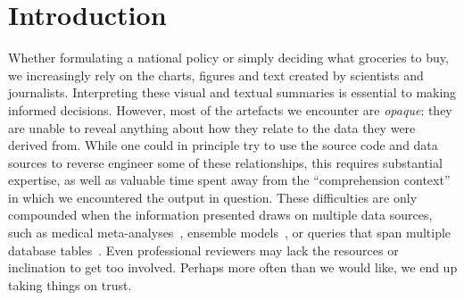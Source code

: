 \section{Introduction}
\label{sec:introduction}

Whether formulating a national policy or simply deciding what groceries to buy, we increasingly rely on the
charts, figures and text created by scientists and journalists. Interpreting these visual and textual
summaries is essential to making informed decisions. However, most of the artefacts we encounter are \emph{opaque}: they are unable to reveal anything about how they relate to the data they were derived from. While one could in principle try to use the source code and data sources to reverse engineer some of these relationships, this requires substantial expertise, as well as valuable time spent away from the ``comprehension context'' in which we encountered the output in question.  These difficulties are only compounded when the information presented draws on multiple data sources, such as medical meta-analyses~\citep{dersimonian86}, ensemble models~\citep{murphy04}, or queries that span multiple database tables~\citep{selinger79}. Even professional reviewers may lack the resources or inclination to get too involved. Perhaps more often than we would like, we end up taking things on trust.
